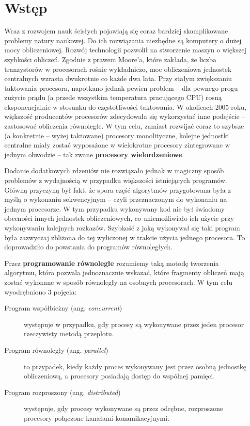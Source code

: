 \section{Wstęp}

Wraz z rozwojem nauk ścisłych pojawiają się coraz bardziej skomplikowane problemy natury naukowej. Do ich rozwiązania niezbędne są komputery o dużej mocy obliczeniowej. Rozwój technologii pozwolił na stworzenie maszyn o większej szybkości obliczeń. Zgodnie z prawem Moore'a, które zakłada, że liczba tranzystorów w procesorach rośnie wykładniczo, moc obliczeniowa jednostek centralnych wzrasta dwukrotnie co każde dwa lata. Przy stałym zwiększaniu taktowania procesora, napotkano jednak pewien problem -- dla pewnego progu zużycie prądu (a przede wszystkim temperatura pracującego CPU) rosną eksponencjalnie w stosunku do częstotliwości taktowania. W okolicach 2005 roku, większość producentów procesorów zdecydowała się wykorzystać inne podejście -- zastosować obliczenia równoległe. W tym celu, zamiast rozwijać coraz to szybsze (a konkretnie -- wyżej taktowane) procesory monolityczne, kolejne jednostki centralne miały zostać wyposażone w wielokrotne procesory zintegrowane w jednym obwodzie -- tak zwane \textbf{procesory wielordzeniowe}.

Dodanie dodatkowych rdzeniów nie rozwiązało jednak w magiczny sposób problemów z wydajnością w przypadku większości istniejących programów. Główną przyczyną był fakt, że spora część algorytmów przygotowana była z myślą o wykonaniu sekwencyjnym -- czyli przeznaczonym do wykonaniu na jednym procesorze. W tym przypadku wykonywany kod nie był świadomy obecności innych jednostek obliczeniowych, co uniemożliwiało ich użycie przy wykonywaniu kolejnych rozkazów. Szybkość z jaką wykonywał się taki program była zazwyczaj zbliżona do tej wyliczonej w trakcie użycia jednego procesora. To doprowadziło do powstania do programów równoległych.

Przez \textbf{programowanie równoległe} rozumiemy taką motodę tworzenia algorytmu, która pozwala jednoznacznie wskazać, które fragmenty obliczeń mają zostać wykonane w sposób równoległy na osobnych procesorach. W tym celu wyodrębniono 3 pojęcia:

\begin{description}
	\item[Program współbieżny (ang. \textit{concurrent})] występuje w przypadku, gdy procesy są wykonywane przez jeden procesor rzeczywisty metodą przeplotu.
	\item[Program równoległy (ang. \textit{parallel})] to przypadek, kiedy każdy proces wykonywany jest przez osobną jednostkę obliczeniową, a procesory posiadają dostęp do wspólnej pamięci.
	\item[Program rozproszony (ang. \textit{distributed})] występuje, gdy procesy wykonywane są przez odrębne, rozproszone procesory połączone kanałami komunikacyjnymi.
\end{description}

